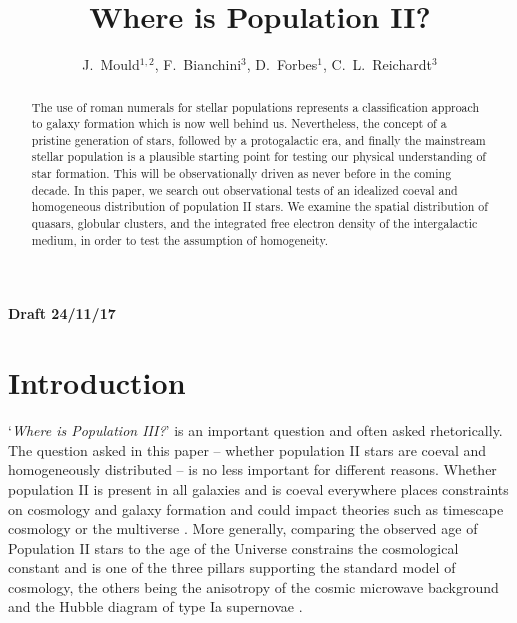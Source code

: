 \documentclass[]{pasa}
\title[Draft Pop II]{Where is Population II?}
\author {J.~Mould$^{1,2}$, F.~Bianchini$^3$, D.~Forbes$^1$, C.~L.~Reichardt$^3$ 
\affil{$^1$Centre for Astrophysics and Supercomputing, Swinburne University, Vic 3122, Australia}
\affil{$^2$CAASTRO}
\affil{$^3$School of Physics, Melbourne University, Vic 3010, Australia}
}
\begin{document}
\begin{frontmatter}
\maketitle

\begin{abstract}
The use of roman numerals for stellar populations represents a classification
approach to galaxy formation which is now well behind us. Nevertheless, the
concept of a pristine generation of stars, followed by a protogalactic era, and finally the mainstream stellar population is a plausible starting point for testing our physical understanding of star formation. 
This will be observationally driven as never before in the coming decade. 
In this paper, we search out observational tests of an idealized coeval and homogeneous distribution of population II stars.
We examine the spatial distribution of quasars, globular clusters, and the integrated free electron density of the intergalactic medium, in order to test the assumption of homogeneity. 
\end{abstract}

\end{frontmatter}


\large{\bf Draft 24/11/17} 



\section{Introduction}
`{\it Where is Population III?}' is an important question \citep{Ishiyama2016} and often asked rhetorically. 
The question asked in this paper -- whether population II stars are coeval and homogeneously distributed --  is no less important for different reasons.
Whether population II is present in all galaxies and is coeval everywhere places constraints on cosmology and galaxy formation and could impact theories such as timescape cosmology \citep{Wiltshire2009} or the multiverse \citep{rees2001}. 
More generally, comparing the observed age of Population II stars to the age of the Universe constrains the cosmological constant and is one of the three pillars supporting the standard model of cosmology, the others being the anisotropy of the cosmic microwave background \citep[CMB]{planck_params} and the Hubble diagram of type Ia supernovae \citep{Turner2001}. 
\end{document}
